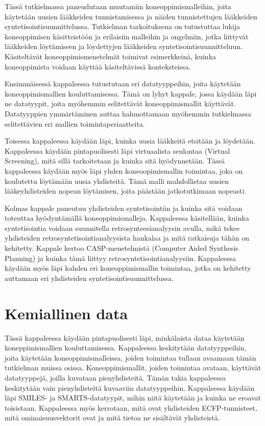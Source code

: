 \documentclass[finnish,twoside,censored,tkt,sw-line]{HYthesisML}
\begin{document}
Tässä tutkielmassa paneudutaan muutamiin koneoppimismalleihin, joita käytetään uusien lääkkeiden tunnistamisessa ja näiden tunnistettujen lääkkeiden syntetisointisuunnittelussa.
Tutkielman tarkoituksena on tutustuttaa lukija koneoppimisen käsitteistöön ja erilaisiin malleihin ja ongelmiin, jotka liittyvät lääkkeiden löytämiseen ja löydettyjen lääkkeiden syntetisointisuunnitteluun.
Käsiteltävät koneoppimismenetelmät toimivat esimerkkeinä, kuinka koneoppimista voidaan käyttää käsiteltävissä konteksteissa.

Ensimmäisessä kappaleessa tutustutaan eri datatyyppeihin, joita käytetään koneoppimismallien kouluttamisessa.
Tämä on lyhyt kappale, jossa käydään läpi ne datatyypit, joita myöhemmin selitettävät koneoppimismallit käyttävät.
Datatyyppien ymmärtäminen auttaa hahmottamaan myöhemmin tutkielmassa selitettävien eri mallien toimintaperiaatteita.

Toisessa kappaleessa käydään läpi, kuinka uusia lääkkeitä etsitään ja löydetään.
Kappaleessa käydään pintapuolisesti läpi virtuaalista seulontaa (Virtual Screening), mitä sillä tarkoitetaan ja kuinka sitä hyödynnetään.
Tässä kappaleessa käydään myös läpi yhden koneoopimismallin toimintaa, joka on koulutettu löytämään uusia yhdisteitä.
Tämä malli mahdollistaa uusien lääkeyhdisteiden nopean löytämisen, joita päästään jatkotutkimaan nopeasti.

Kolmas kappale paneutuu yhdisteiden syntetisointiin ja kuinka sitä voidaan toteuttaa hyödyntämällä koneoppimismalleja.
Kappaleessa käsitellään, kuinka syntetisointia voidaan suunnitella retrosynteesianalyysin avulla, mikä tekee yhdisteiden retrosyntetisointianalyysista hankalaa ja mitä ratkaisuja tähän on kehitetty.
Kappale kertoo CASP-menetelmistä (Computer Aided Synthesis Planning) ja kuinka tämä liittyy retrosyntetisointianalyysiin.
Kappaleessa käydään myös läpi kahden eri koneoppimismallin toimintaa, jotka on kehitetty auttamaan eri yhdisteiden syntetisointisuunnittelussa.

\chapter{Kemiallinen data}

Tässä kappaleessa käydään pintapuolisesti läpi, minkälaista dataa käytetään koneppimismallien kouluttamisessa.
Kappaleessa keskitytään datatyyppeihin, joita käytetään koneoppimismalleissa, joiden toimintaa tullaan avaamaan tämän tutkielman muissa osissa.
Koneoppimismallit, joiden toimintaa avataan, käyttävät datatyyppejä, joilla kuvataan pienyhdisteitä.
Tämän takia kappaleessa keskitytään vain pienyhdisteitä kuvaaviin datatyyppeihin.
Kappaleessa käydään läpi SMILES- ja SMARTS-datatyypit, mihin niitä käytetään ja kuinka ne eroavat toisistaan.
Kappaleessa myös kerrotaan, mitä ovat yhdisteiden ECFP-tunnisteet, mitä ominaisuusvektorit ovat ja mitä tietoa ne sisältävät yhdisteistä.
\end{document}
